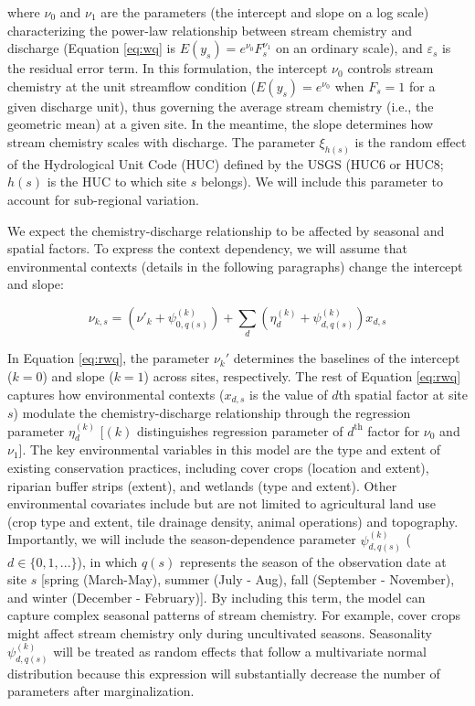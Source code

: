 \documentclass[12pt, class=article, crop=false]{standalone}
\begin{document}
where $\nu_0$ and $\nu_1$ are the parameters (the intercept and slope on a log scale) characterizing the power-law relationship between stream chemistry and discharge (Equation \ref{eq:wq} is $E(y_s) = e^{\nu_0}F_s^{\nu_1}$ on an ordinary scale), and $\varepsilon_s$ is the residual error term.
In this formulation, the intercept $\nu_0$ controls stream chemistry at the unit streamflow condition ($E(y_s) = e^{\nu_0}$ when $F_s = 1$ for a given discharge unit), thus governing the average stream chemistry (i.e., the geometric mean) at a given site.
In the meantime, the slope determines how stream chemistry scales with discharge. The parameter $\xi_{h(s)}$ is the random effect of the Hydrological Unit Code (HUC) defined by the USGS (HUC6 or HUC8; $h(s)$ is the HUC to which site $s$ belongs).
We will include this parameter to account for sub-regional variation.

We expect the chemistry-discharge relationship to be affected by seasonal and spatial factors.
To express the context dependency, we will assume that environmental contexts (details in the following paragraphs) change the intercept and slope:

\begin{equation}\label{eq:rwq}
\nu_{k, s} = (\nu'_k + \psi^{(k)}_{0,q(s)}) + \sum_d (\eta^{(k)}_d + \psi^{(k)}_{d,q(s)}) x_{d,s}
\end{equation}

In Equation \ref{eq:rwq}, the parameter $\nu_k'$ determines the baselines of the intercept ($k=0$) and slope ($k=1$) across sites, respectively.
The rest of Equation \ref{eq:rwq} captures how environmental contexts ($x_{d,s}$ is the value of $d$th spatial factor at site $s$) modulate the chemistry-discharge relationship through the regression parameter $\eta^{(k)}_d$ [$(k)$ distinguishes regression parameter of $d^{\text{th}}$ factor for $\nu_0$ and $\nu_1$].
The key environmental variables in this model are the type and extent of existing conservation practices, including cover crops (location and extent), riparian buffer strips (extent), and wetlands (type and extent).
Other environmental covariates include but are not limited to agricultural land use (crop type and extent, tile drainage density, animal operations) and topography.
Importantly, we will include the season-dependence parameter $\psi^{(k)}_{d,q(s)}$ ($d \in \{0, 1,...\}$), in which $q(s)$ represents the season of the observation date at site $s$ [spring (March-May), summer (July - Aug), fall (September - November), and winter (December - February)].
By including this term, the model can capture complex seasonal patterns of stream chemistry.
For example, cover crops might affect stream chemistry only during uncultivated seasons.
Seasonality $\psi^{(k)}_{d,q(s)}$ will be treated as random effects that follow a multivariate normal distribution because this expression will substantially decrease the number of parameters after marginalization.
\end{document}
